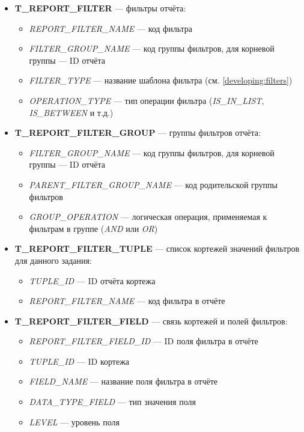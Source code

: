 \documentclass[../user-manual.tex]{subfiles}
\begin{document}
	\begin{itemize}
		\item \textbf{T\_REPORT\_FILTER} --- фильтры отчёта:
		
			\begin{itemize}
				\item \textit{REPORT\_FILTER\_NAME} --- код фильтра
				\item \textit{FILTER\_GROUP\_NAME} --- код группы фильтров, для корневой группы --- ID отчёта
				\item \textit{FILTER\_TYPE} --- название шаблона фильтра (см. \ref{developing:filters})
				\item \textit{OPERATION\_TYPE} --- тип операции фильтра (\textit{IS\_IN\_LIST}, \textit{IS\_BETWEEN} и т.д.)
			\end{itemize}
		
		\item \textbf{T\_REPORT\_FILTER\_GROUP} --- группы фильтров отчёта:
		
			\begin{itemize}
				\item \textit{FILTER\_GROUP\_NAME} --- код группы фильтров, для корневой группы --- ID отчёта
				\item \textit{PARENT\_FILTER\_GROUP\_NAME} --- код родительской группы фильтров
				\item \textit{GROUP\_OPERATION} --- логическая операция, применяемая к фильтрам в группе (\textit{AND} или \textit{OR})
			\end{itemize}
		
		\item \textbf{T\_REPORT\_FILTER\_TUPLE} --- список кортежей значений фильтров для данного задания:

			\begin{itemize}
				\item \textit{TUPLE\_ID} --- ID отчёта кортежа
				\item \textit{REPORT\_FILTER\_NAME} --- код фильтра в отчёте           
			\end{itemize}		
		
		\item \textbf{T\_REPORT\_FILTER\_FIELD} --- связь кортежей и полей фильтров:
	
			\begin{itemize}
				\item \textit{REPORT\_FILTER\_FIELD\_ID} --- ID поля фильтра в отчёте
				\item \textit{TUPLE\_ID} --- ID кортежа
				\item \textit{FIELD\_NAME} --- название поля фильтра в отчёте
				\item \textit{DATA\_TYPE\_FIELD} --- тип значения поля
				\item \textit{LEVEL} --- уровень поля
			\end{itemize}
		

\end{itemize}
\end{document}
